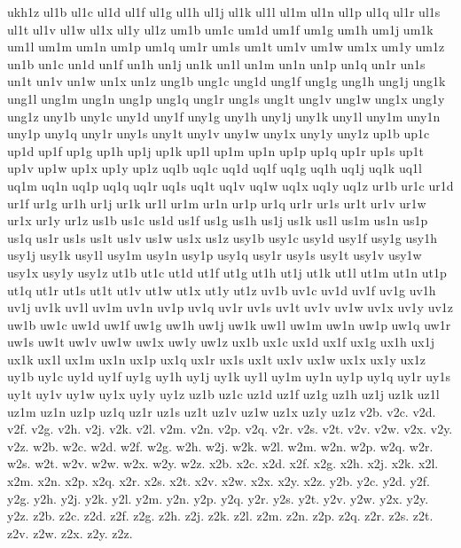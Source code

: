 {ukh1z
ul1b
ul1c
ul1d
ul1f
ul1g
ul1h
ul1j
ul1k
ul1l
ul1m
ul1n
ul1p
ul1q
ul1r
ul1s
ul1t
ul1v
ul1w
ul1x
ul1y
ul1z
um1b
um1c
um1d
um1f
um1g
um1h
um1j
um1k
um1l
um1m
um1n
um1p
um1q
um1r
um1s
um1t
um1v
um1w
um1x
um1y
um1z
un1b
un1c
un1d
un1f
un1h
un1j
un1k
un1l
un1m
un1n
un1p
un1q
un1r
un1s
un1t
un1v
un1w
un1x
un1z
ung1b
ung1c
ung1d
ung1f
ung1g
ung1h
ung1j
ung1k
ung1l
ung1m
ung1n
ung1p
ung1q
ung1r
ung1s
ung1t
ung1v
ung1w
ung1x
ung1y
ung1z
uny1b
uny1c
uny1d
uny1f
uny1g
uny1h
uny1j
uny1k
uny1l
uny1m
uny1n
uny1p
uny1q
uny1r
uny1s
uny1t
uny1v
uny1w
uny1x
uny1y
uny1z
up1b
up1c
up1d
up1f
up1g
up1h
up1j
up1k
up1l
up1m
up1n
up1p
up1q
up1r
up1s
up1t
up1v
up1w
up1x
up1y
up1z
uq1b
uq1c
uq1d
uq1f
uq1g
uq1h
uq1j
uq1k
uq1l
uq1m
uq1n
uq1p
uq1q
uq1r
uq1s
uq1t
uq1v
uq1w
uq1x
uq1y
uq1z
ur1b
ur1c
ur1d
ur1f
ur1g
ur1h
ur1j
ur1k
ur1l
ur1m
ur1n
ur1p
ur1q
ur1r
ur1s
ur1t
ur1v
ur1w
ur1x
ur1y
ur1z
us1b
us1c
us1d
us1f
us1g
us1h
us1j
us1k
us1l
us1m
us1n
us1p
us1q
us1r
us1s
us1t
us1v
us1w
us1x
us1z
usy1b
usy1c
usy1d
usy1f
usy1g
usy1h
usy1j
usy1k
usy1l
usy1m
usy1n
usy1p
usy1q
usy1r
usy1s
usy1t
usy1v
usy1w
usy1x
usy1y
usy1z
ut1b
ut1c
ut1d
ut1f
ut1g
ut1h
ut1j
ut1k
ut1l
ut1m
ut1n
ut1p
ut1q
ut1r
ut1s
ut1t
ut1v
ut1w
ut1x
ut1y
ut1z
uv1b
uv1c
uv1d
uv1f
uv1g
uv1h
uv1j
uv1k
uv1l
uv1m
uv1n
uv1p
uv1q
uv1r
uv1s
uv1t
uv1v
uv1w
uv1x
uv1y
uv1z
uw1b
uw1c
uw1d
uw1f
uw1g
uw1h
uw1j
uw1k
uw1l
uw1m
uw1n
uw1p
uw1q
uw1r
uw1s
uw1t
uw1v
uw1w
uw1x
uw1y
uw1z
ux1b
ux1c
ux1d
ux1f
ux1g
ux1h
ux1j
ux1k
ux1l
ux1m
ux1n
ux1p
ux1q
ux1r
ux1s
ux1t
ux1v
ux1w
ux1x
ux1y
ux1z
uy1b
uy1c
uy1d
uy1f
uy1g
uy1h
uy1j
uy1k
uy1l
uy1m
uy1n
uy1p
uy1q
uy1r
uy1s
uy1t
uy1v
uy1w
uy1x
uy1y
uy1z
uz1b
uz1c
uz1d
uz1f
uz1g
uz1h
uz1j
uz1k
uz1l
uz1m
uz1n
uz1p
uz1q
uz1r
uz1s
uz1t
uz1v
uz1w
uz1x
uz1y
uz1z
v2b.
v2c.
v2d.
v2f.
v2g.
v2h.
v2j.
v2k.
v2l.
v2m.
v2n.
v2p.
v2q.
v2r.
v2s.
v2t.
v2v.
v2w.
v2x.
v2y.
v2z.
w2b.
w2c.
w2d.
w2f.
w2g.
w2h.
w2j.
w2k.
w2l.
w2m.
w2n.
w2p.
w2q.
w2r.
w2s.
w2t.
w2v.
w2w.
w2x.
w2y.
w2z.
x2b.
x2c.
x2d.
x2f.
x2g.
x2h.
x2j.
x2k.
x2l.
x2m.
x2n.
x2p.
x2q.
x2r.
x2s.
x2t.
x2v.
x2w.
x2x.
x2y.
x2z.
y2b.
y2c.
y2d.
y2f.
y2g.
y2h.
y2j.
y2k.
y2l.
y2m.
y2n.
y2p.
y2q.
y2r.
y2s.
y2t.
y2v.
y2w.
y2x.
y2y.
y2z.
z2b.
z2c.
z2d.
z2f.
z2g.
z2h.
z2j.
z2k.
z2l.
z2m.
z2n.
z2p.
z2q.
z2r.
z2s.
z2t.
z2v.
z2w.
z2x.
z2y.
z2z.
}
\endinput
